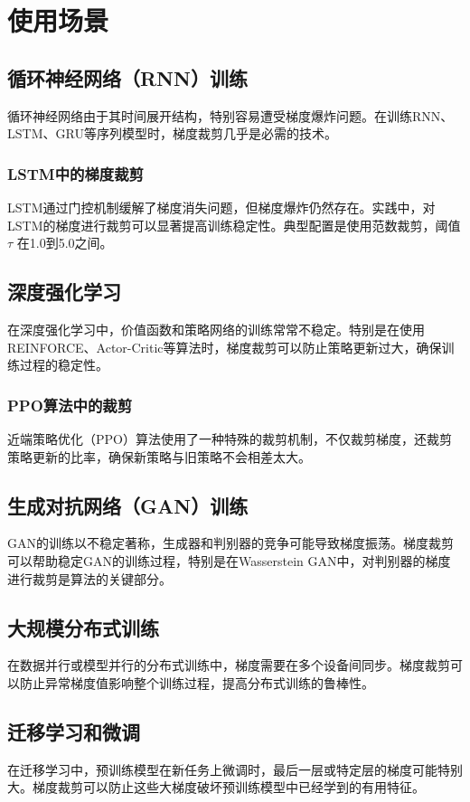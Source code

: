 \documentclass{article}
\begin{document}
\section{使用场景}

\subsection{循环神经网络（RNN）训练}
循环神经网络由于其时间展开结构，特别容易遭受梯度爆炸问题。在训练RNN、LSTM、GRU等序列模型时，梯度裁剪几乎是必需的技术。

\subsubsection{LSTM中的梯度裁剪}
LSTM通过门控机制缓解了梯度消失问题，但梯度爆炸仍然存在。实践中，对LSTM的梯度进行裁剪可以显著提高训练稳定性。典型配置是使用范数裁剪，阈值 $\tau$ 在1.0到5.0之间。

\subsection{深度强化学习}
在深度强化学习中，价值函数和策略网络的训练常常不稳定。特别是在使用REINFORCE、Actor-Critic等算法时，梯度裁剪可以防止策略更新过大，确保训练过程的稳定性。

\subsubsection{PPO算法中的裁剪}
近端策略优化（PPO）算法使用了一种特殊的裁剪机制，不仅裁剪梯度，还裁剪策略更新的比率，确保新策略与旧策略不会相差太大。

\subsection{生成对抗网络（GAN）训练}
GAN的训练以不稳定著称，生成器和判别器的竞争可能导致梯度振荡。梯度裁剪可以帮助稳定GAN的训练过程，特别是在Wasserstein GAN中，对判别器的梯度进行裁剪是算法的关键部分。

\subsection{大规模分布式训练}
在数据并行或模型并行的分布式训练中，梯度需要在多个设备间同步。梯度裁剪可以防止异常梯度值影响整个训练过程，提高分布式训练的鲁棒性。

\subsection{迁移学习和微调}
在迁移学习中，预训练模型在新任务上微调时，最后一层或特定层的梯度可能特别大。梯度裁剪可以防止这些大梯度破坏预训练模型中已经学到的有用特征。
\end{document}
